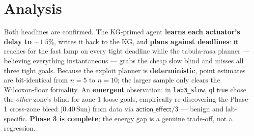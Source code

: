 \documentclass[10pt,a4paper]{article}
\newcommand{\file}[1]{\texttt{\small #1}}
\newcommand{\kw}[1]{\textbf{#1}}
\begin{document}
\section{Analysis}
Both headlines are confirmed. The KG-primed agent \kw{learns each actuator's delay to \(\sim\!1.5\%\)},
writes it back to the KG, and \kw{plans against deadlines}: it reaches for the fast lamp on every tight
deadline while the tabula-rasa planner — believing everything instantaneous — grabs the cheap slow blind
and misses all three tight goals. Because the exploit planner is \kw{deterministic}, point estimates are
bit-identical from \(n{=}5\) to \(n{=}10\); the larger sample only clears the Wilcoxon-floor formality. An
\kw{emergent} observation: in \file{lab3\_slow}, \(\textsf{ql\_true}\) chose the \emph{other} zone's blind
for zone-1 loose goals, empirically re-discovering the Phase-1 cross-zone bleed (\(0.40\,\text{Sun}\)) from
data via \(\textsf{action\_effect/3}\) — benign and lab-specific. \kw{Phase 3 is complete}; the energy gap
is a genuine trade-off, not a regression.
\end{document}
